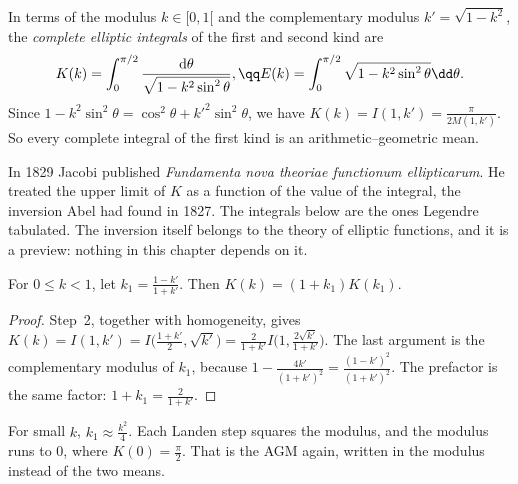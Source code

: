 In terms of the modulus $k\in[0,1[$ and the complementary modulus $k'=\sqrt{1-k^2}$, the \emph{complete elliptic integrals} of the first and second kind are
\[
\begin{gathered}K(k)=\int_0^{\pi/2}\frac{\mathrm d\theta}{\sqrt{1-k^2\sin^2\theta}},\qq E(k)=\int_0^{\pi/2}\sqrt{1-k^2\sin^2\theta}\dd\theta.\end{gathered}
\]
Since $1-k^2\sin^2\theta=\cos^2\theta+k'^2\sin^2\theta$, we have $K(k)=I(1,k')=\frac\pi{2M(1,k')}$. So every complete integral of the first kind is an arithmetic--geometric mean.


In 1829 Jacobi published \emph{Fundamenta nova theoriae functionum ellipticarum}. He treated the upper limit of $K$ as a function of the value of the integral, the inversion Abel had found in 1827. The integrals below are the ones Legendre tabulated. The inversion itself belongs to the theory of elliptic functions, and it is a preview: nothing in this chapter depends on it.

\begin{corollary}\label{cor:landen}
For $0\le k<1$, let $k_1=\frac{1-k'}{1+k'}$. Then $K(k)=(1+k_1)K(k_1)$.
\end{corollary}
\begin{proof}
Step~2, together with homogeneity, gives $K(k)=I(1,k')=I\bigl(\frac{1+k'}2,\sqrt{k'}\bigr)=\frac2{1+k'}I\bigl(1,\frac{2\sqrt{k'}}{1+k'}\bigr)$. The last argument is the complementary
modulus of $k_1$, because $1-\frac{4k'}{(1+k')^2}=\frac{(1-k')^2}{(1+k')^2}$. The prefactor is the same factor: $1+k_1=\frac2{1+k'}$.
\end{proof}

For small $k$, $k_1\approx\frac{k^2}4$. Each Landen step squares the modulus, and the modulus runs to $0$, where $K(0)=\frac\pi2$. That is the AGM again, written in the modulus instead of the two means.

